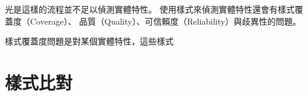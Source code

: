 光是這樣的流程並不足以偵測實體特性。
使用樣式來偵測實體特性還會有樣式覆蓋度（Coverage）、
品質（Quality）、可信賴度（Reliability）與歧異性的問題。



樣式覆蓋度問題是對某個實體特性，這些樣式

%

\section{樣式比對}
\label{s:pattern-match}

%
%
%

%
%
%
%



%
%
%
%
%
%
%


